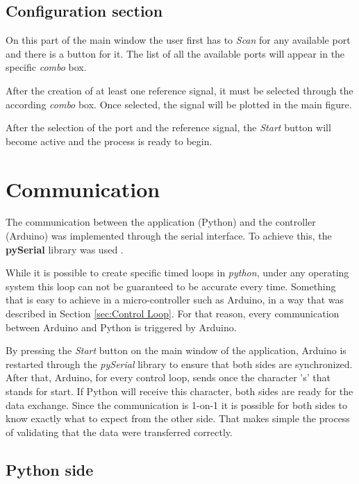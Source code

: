 \subsection{Configuration section}

On this part of the main window the user first has to \textit{Scan} for any available port and there is a button for it. The list of all the available ports will appear in the specific \textit{combo} box. 

After the creation of at least one reference signal, it must be selected through the according \textit{combo} box. Once selected, the signal will be plotted in the main figure.

After the selection of the port and the reference signal, the \textit{Start} button will become active and the process is ready to begin.


\section{Communication} \label{sec:COM}

The communication between the application (Python) and the controller (Arduino) was implemented through the serial interface. To achieve this, the \textbf{pySerial} library was used \cite{PySerial}. 

While it is possible to create specific timed loops in \textit{python}, under any operating system this loop can not be guaranteed to be accurate every time. Something that is easy to achieve in a micro-controller such as Arduino, in a way that was described in Section \ref{sec:Control Loop}. For that reason, every communication between Arduino and Python is triggered by Arduino.

By pressing the \textit{Start} button on the main window of the application, Arduino is restarted through the \textit{pySerial} library to ensure that both sides are synchronized. After that, Arduino, for every control loop, sends once the character 's' that stands for start. If Python will receive this character, both sides are ready for the data exchange. Since the communication is 1-on-1 it is possible for both sides to know exactly what to expect from the other side. That makes simple the process of validating that the data were transferred correctly.

\subsection{Python side} \label{subsec:app_COM}

